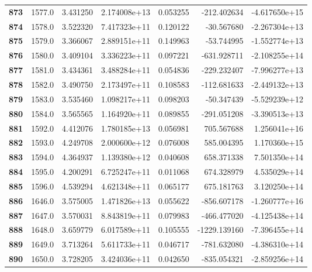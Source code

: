 \documentclass{report}[12pt]
\begin{document}
\begin{center}
\begin{tabular}{lrrrrrr}
\textbf{873 } &         1577.0 &   3.431250 &  2.174008e+13 &    0.053255 &  -212.402634 & -4.617650e+15 \\
\textbf{874 } &         1578.0 &   3.522320 &  7.417323e+11 &    0.120122 &   -30.567680 & -2.267304e+13 \\
\textbf{875 } &         1579.0 &   3.366067 &  2.889151e+11 &    0.149963 &   -53.744995 & -1.552774e+13 \\
\textbf{876 } &         1580.0 &   3.409104 &  3.336223e+11 &    0.097221 &  -631.928711 & -2.108255e+14 \\
\textbf{877 } &         1581.0 &   3.434361 &  3.488284e+11 &    0.054836 &  -229.232407 & -7.996277e+13 \\
\textbf{878 } &         1582.0 &   3.490750 &  2.173497e+11 &    0.108583 &  -112.681633 & -2.449132e+13 \\
\textbf{879 } &         1583.0 &   3.535460 &  1.098217e+11 &    0.098203 &   -50.347439 & -5.529239e+12 \\
\textbf{880 } &         1584.0 &   3.565565 &  1.164920e+11 &    0.089855 &  -291.051208 & -3.390513e+13 \\
\textbf{881 } &         1592.0 &   4.412076 &  1.780185e+13 &    0.056981 &   705.567688 &  1.256041e+16 \\
\textbf{882 } &         1593.0 &   4.249708 &  2.000600e+12 &    0.076008 &   585.004395 &  1.170360e+15 \\
\textbf{883 } &         1594.0 &   4.364937 &  1.139380e+12 &    0.040608 &   658.371338 &  7.501350e+14 \\
\textbf{884 } &         1595.0 &   4.200291 &  6.725247e+11 &    0.011068 &   674.328979 &  4.535029e+14 \\
\textbf{885 } &         1596.0 &   4.539294 &  4.621348e+11 &    0.065177 &   675.181763 &  3.120250e+14 \\
\textbf{886 } &         1646.0 &   3.575005 &  1.471826e+13 &    0.055622 &  -856.607178 & -1.260777e+16 \\
\textbf{887 } &         1647.0 &   3.570031 &  8.843819e+11 &    0.079983 &  -466.477020 & -4.125438e+14 \\
\textbf{888 } &         1648.0 &   3.659779 &  6.017589e+11 &    0.105555 & -1229.139160 & -7.396455e+14 \\
\textbf{889 } &         1649.0 &   3.713264 &  5.611733e+11 &    0.046717 &  -781.632080 & -4.386310e+14 \\
\textbf{890 } &         1650.0 &   3.728205 &  3.424036e+11 &    0.042650 &  -835.054321 & -2.859256e+14 \\

\end{tabular}
\end{center}
\end{document}
